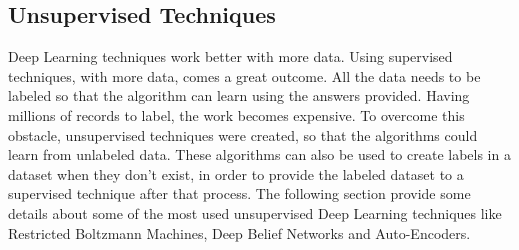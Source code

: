 \documentclass[
  twoside,
  11pt, a4paper,
  footinclude=true,
  headinclude=true,
  cleardoublepage=empty
]{scrbook}
\begin{document}

      \subsection{Unsupervised Techniques}
        Deep Learning techniques work better with more data. Using supervised techniques, with more data, comes a great outcome. All the data needs to be labeled so that the algorithm can learn using the answers provided. Having millions of records to label, the work becomes expensive. To overcome this obstacle, unsupervised techniques were created, so that the algorithms could learn from unlabeled data. These algorithms can also be used to create labels in a dataset when they don't exist, in order to provide the labeled dataset to a supervised technique after that process. The following section provide some details about some of the most used unsupervised Deep Learning techniques like Restricted Boltzmann Machines, Deep Belief Networks and Auto-Encoders.
\end{document}
